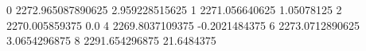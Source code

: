 0 2272.965087890625 2.959228515625
1 2271.056640625 1.05078125
2 2270.005859375 0.0
4 2269.8037109375 -0.2021484375
6 2273.0712890625 3.0654296875
8 2291.654296875 21.6484375
